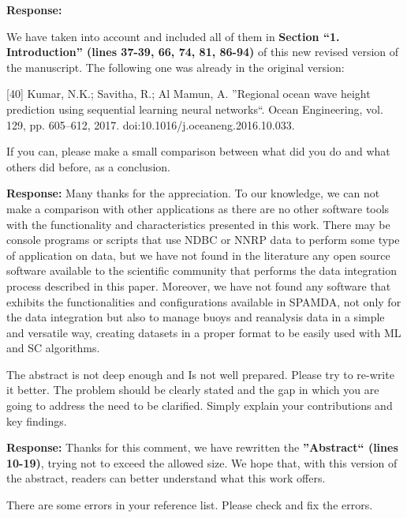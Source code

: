 \documentclass[a4paper,twoside,11pt]{article}
\newcounter{comments}[section]
\newcommand{\rcomment}[1]
{
	\stepcounter{comments}
	\vspace{0.6cm}
	\begin{tcolorbox}[colback=black!5,colframe=white!45!black,title=Comment \arabic{comments}]
		#1
	\end{tcolorbox}
}
\begin{document}
\textbf{Response:}
{
We have taken into account and included all of them in \textbf{Section ``1. Introduction'' (lines 37-39, 66, 74, 81, 86-94)} of this new revised version of the manuscript. The following one was already in the original version:

[40] Kumar, N.K.; Savitha, R.; Al Mamun, A. ''Regional ocean wave height prediction using sequential learning neural networks``. Ocean Engineering, vol. 129, pp. 605–612, 2017. doi:10.1016/j.oceaneng.2016.10.033.


}

\newpage
\rcomment
{
If you can, please make a small comparison between what did you do and what others did before, as a conclusion.

}

\textbf{Response:}
{
Many thanks for the appreciation. To our knowledge, we can not make a comparison with other applications as there are no other software tools with the functionality and characteristics presented in this work. There may be console programs or scripts that use NDBC or NNRP data to perform some type of application on data, but we have not found in the literature any open source software available to the scientific community that performs the data integration process described in this paper. Moreover, we have not found any software that exhibits the functionalities and configurations available in SPAMDA, not only for the data integration but also to manage buoys and reanalysis data in a simple and versatile way, creating datasets in  a proper format to be easily used with ML and SC algorithms.
}

\rcomment
{
The abstract is not deep enough and Is not well prepared. Please try to re-write it better. The problem should be clearly stated and the gap in which you are going to address the need to be clarified. Simply explain your contributions and key findings.
}

\textbf{Response:}
{
Thanks for this comment, we have rewritten the \textbf{''Abstract`` (lines 10-19)}, trying not to exceed  the allowed size. We hope that, with this version of the abstract, readers can better understand what this work offers.
}

\rcomment
{
There are some errors in your reference list. Please check and fix the errors.
}
\end{document}
